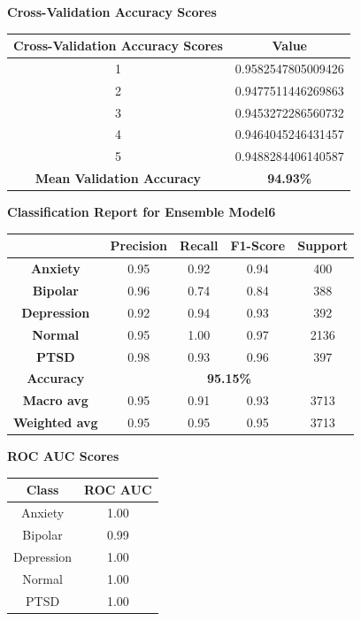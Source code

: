\begin{center}
    \textbf{Cross-Validation Accuracy Scores} \\[0.5em]
    \begin{tabular}{|c|c|}
        \hline
        \textbf{Cross-Validation Accuracy Scores} & \textbf{Value} \\ \hline
        1 & 0.9582547805009426 \\ \hline
        2 & 0.9477511446269863 \\ \hline
        3 & 0.9453272286560732 \\ \hline
        4 & 0.9464045246431457 \\ \hline
        5 & 0.9488284406140587 \\ \hline
        \textbf{Mean Validation Accuracy} & \textbf{94.93\%} \\ \hline
    \end{tabular}
\end{center}

\begin{center}
    \textbf{Classification Report for Ensemble Model6} \\[0.5em]
    \begin{tabular}{|c|c|c|c|c|}
        \hline
        & \textbf{Precision} & \textbf{Recall} & \textbf{F1-Score} & \textbf{Support} \\ \hline
        \textbf{Anxiety}    & 0.95 & 0.92 & 0.94 & 400 \\ \hline
        \textbf{Bipolar}    & 0.96 & 0.74 & 0.84 & 388 \\ \hline
        \textbf{Depression} & 0.92 & 0.94 & 0.93 & 392 \\ \hline
        \textbf{Normal}     & 0.95 & 1.00 & 0.97 & 2136 \\ \hline
        \textbf{PTSD}       & 0.98 & 0.93 & 0.96 & 397 \\ \hline
        \textbf{Accuracy}   & \multicolumn{4}{c|}{\textbf{95.15\%}} \\ \hline
        \textbf{Macro avg}  & 0.95 & 0.91 & 0.93 & 3713 \\ \hline
        \textbf{Weighted avg} & 0.95 & 0.95 & 0.95 & 3713 \\ \hline
    \end{tabular}
\end{center}

\begin{center}
    \textbf{ROC AUC Scores} \\[0.5em]
    \begin{tabular}{|c|c|}
        \hline
        \textbf{Class} & \textbf{ROC AUC} \\ \hline
        Anxiety & 1.00 \\ \hline
        Bipolar & 0.99 \\ \hline
        Depression & 1.00 \\ \hline
        Normal & 1.00 \\ \hline
        PTSD & 1.00 \\ \hline
    \end{tabular}
\end{center}

